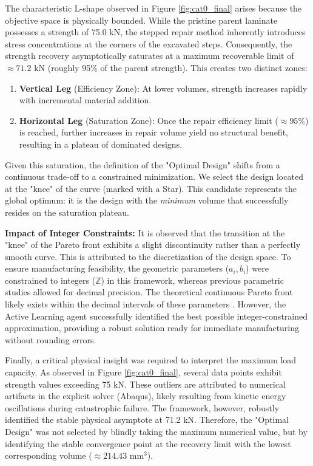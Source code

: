 \documentclass[
  preprint,
  12pt,
  a4paper
]{elsarticle}
\begin{document}
The characteristic L-shape observed in Figure \ref{fig:cat0_final} arises because the objective space is physically bounded. While the pristine parent laminate possesses a strength of 75.0 kN, the stepped repair method inherently introduces stress concentrations at the corners of the excavated steps. Consequently, the strength recovery asymptotically saturates at a maximum recoverable limit of $\approx 71.2$ kN (roughly 95\% of the parent strength). This creates two distinct zones:
\begin{enumerate}
    \item \textbf{Vertical Leg} (Efficiency Zone): At lower volumes, strength increases rapidly with incremental material addition.
    \item \textbf{Horizontal Leg} (Saturation Zone): Once the repair efficiency limit ($\approx 95\%$) is reached, further increases in repair volume yield no structural benefit, resulting in a plateau of dominated designs.
\end{enumerate}

Given this saturation, the definition of the "Optimal Design" shifts from a continuous trade-off to a constrained minimization. We select the design located at the "knee" of the curve (marked with a Star). This candidate represents the global optimum: it is the design with the \textit{minimum} volume that successfully resides on the saturation plateau.

\textbf{Impact of Integer Constraints:}
It is observed that the transition at the "knee" of the Pareto front exhibits a slight discontinuity rather than a perfectly smooth curve. This is attributed to the discretization of the design space. To ensure manufacturing feasibility, the geometric parameters ($a_i, b_i$) were constrained to integers ($\mathbb{Z}$) in this framework, whereas previous parametric studies \cite{psarras2024design} allowed for decimal precision. The theoretical continuous Pareto front likely exists within the decimal intervals of these parameters . However, the Active Learning agent successfully identified the best possible integer-constrained approximation, providing a robust solution ready for immediate manufacturing without rounding errors.

Finally, a critical physical insight was required to interpret the maximum load capacity. As observed in Figure \ref{fig:cat0_final}, several data points exhibit strength values exceeding 75 kN. These outliers are attributed to numerical artifacts in the explicit solver (Abaqus), likely resulting from kinetic energy oscillations during catastrophic failure. The framework, however, robustly identified the stable physical asymptote at 71.2 kN. Therefore, the "Optimal Design" was not selected by blindly taking the maximum numerical value, but by identifying the stable convergence point at the recovery limit with the lowest corresponding volume ($\approx 214.43$ mm$^3$).
\end{document}
